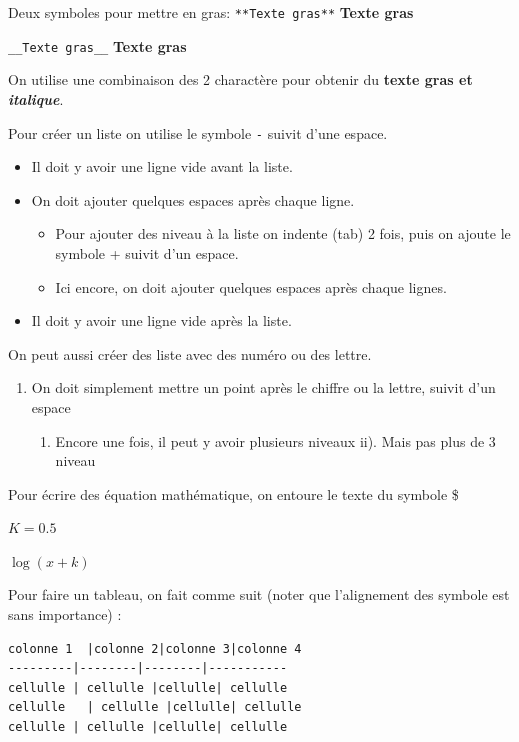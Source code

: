 \documentclass[12pt,]{book}
\providecommand{\tightlist}{%
  \setlength{\itemsep}{0pt}\setlength{\parskip}{0pt}}
\begin{document}
Deux symboles pour mettre en gras:
\texttt{**Texte\ gras**}
\textbf{Texte gras}

\texttt{\_\_Texte\ gras\_\_}
\textbf{Texte gras}

On utilise une combinaison des 2 charactère pour obtenir du \textbf{texte gras et \emph{italique}}.

Pour créer un liste on utilise le symbole \texttt{-} suivit d'une espace.

\begin{itemize}
\tightlist
\item
  Il doit y avoir une ligne vide avant la liste.
\item
  On doit ajouter quelques espaces après chaque ligne.

  \begin{itemize}
  \tightlist
  \item
    Pour ajouter des niveau à la liste on indente (tab) 2 fois, puis on ajoute le symbole + suivit d'un espace.
  \item
    Ici encore, on doit ajouter quelques espaces après chaque lignes.
  \end{itemize}
\item
  Il doit y avoir une ligne vide après la liste.
\end{itemize}

On peut aussi créer des liste avec des numéro ou des lettre.

\begin{enumerate}
\def\labelenumi{\arabic{enumi}.}
\tightlist
\item
  On doit simplement mettre un point après le chiffre ou la lettre, suivit d'un espace

  \begin{enumerate}
  \def\labelenumii{\alph{enumii}.}
  \tightlist
  \item
    Encore une fois, il peut y avoir plusieurs niveaux
    ii). Mais pas plus de 3 niveau
  \end{enumerate}
\end{enumerate}

Pour écrire des équation mathématique, on entoure le texte du symbole \$

\(K = 0.5\)

\(\log(x + k)\)

Pour faire un tableau, on fait comme suit (noter que l'alignement des symbole est sans importance) :

\begin{verbatim}
colonne 1  |colonne 2|colonne 3|colonne 4
---------|--------|--------|-----------
cellulle | cellulle |cellulle| cellulle
cellulle   | cellulle |cellulle| cellulle
cellulle | cellulle |cellulle| cellulle
\end{verbatim}
\end{document}
